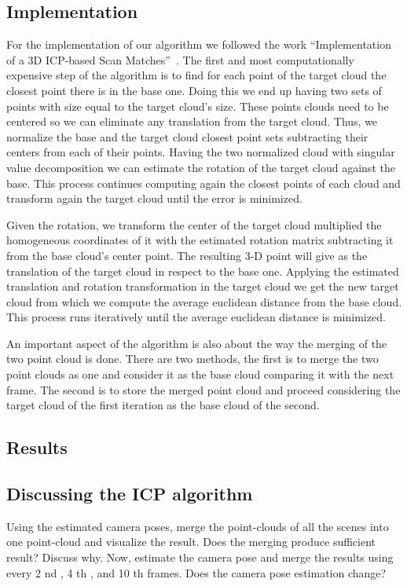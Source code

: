 \subsection{Implementation}
For the implementation of our algorithm we followed the work ``Implementation of a 3D ICP-based Scan Matches''~\cite{icpImp}. The first and most computationally expensive step of the algorithm is to find for each point of the target cloud the closest point there is in the base one. Doing this we end up having two sets of points with size equal to the target cloud's size. These points clouds need to be centered so we can eliminate any translation from the target cloud. Thus, we normalize the base and the target cloud closest point sets subtracting their centers from each of their points. Having the two normalized cloud with singular value decomposition we can estimate the rotation of the target cloud against the base. This process continues computing again the closest points of each cloud and transform again the target cloud until the error is minimized.

Given the rotation, we transform the center of the target cloud multiplied the homogeneous coordinates of it with the estimated rotation matrix subtracting it from the base cloud's center point. The resulting 3-D point will give as the translation of the target cloud in respect to the base one. Applying the estimated translation and rotation transformation in the target cloud we get the new target cloud from which we compute the average euclidean distance from the base cloud. This process runs iteratively until the average euclidean distance is minimized.

An important aspect of the algorithm is also about the way the merging of the two point cloud is done. There are two methods, the first is to merge the two point clouds as one and consider it as the base cloud comparing it with the next frame. The second is to store the merged point cloud and proceed considering the target cloud of the first iteration as the base cloud of the second.


\subsection{Results}


\subsection{Discussing the ICP algorithm}
Using the estimated camera poses, merge the point-clouds of all the scenes into one point-cloud and visualize the result. Does the merging produce sufficient result? Discuss why. Now, estimate the camera pose and merge the results using every 2 nd , 4 th , and 10 th frames. Does the camera pose estimation change?

